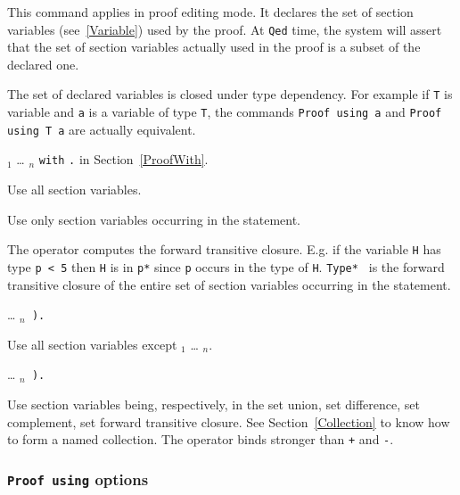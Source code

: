 This command applies in proof editing mode. 
It declares the set of section variables (see~\ref{Variable}) 
used by the proof. At {\tt Qed} time, the system will assert that 
the set of section variables actually used in the proof is a subset of
the declared one.

The set of declared variables is closed under type dependency.
For example if {\tt T} is variable and {\tt a} is a variable of
type {\tt T}, the commands {\tt Proof using a} and
{\tt Proof using T a} are actually equivalent.

 {\ident$_1$} {\ldots} {\ident$_n$} {\tt with} {\tac}{\tt .} 
in Section~\ref{ProofWith}.


  Use all section variables.

  
  Use only section variables occurring in the statement.

  
  The {\tt *} operator computes the forward transitive closure.
  E.g. if the variable {\tt H} has type {\tt p < 5} then {\tt H} is
  in {\tt p*} since {\tt p} occurs in the type of {\tt H}.
  {\tt Type* } is the forward transitive closure of the entire set of
  section variables occurring in the statement.

 {\ldots} {\tt \ident$_n$  ).}
  
  Use all section variables except {\ident$_1$} {\ldots} {\ident$_n$}.



 {\ldots} {\tt \ident$_n$ ).}


  Use section variables being, respectively, in the set union, set difference,
  set complement, set forward transitive closure.
  See Section~\ref{Collection} to know how to form a named
  collection.
  The {\tt *} operator binds stronger than {\tt +} and {\tt -}.

\subsubsection{{\tt Proof using} options}

